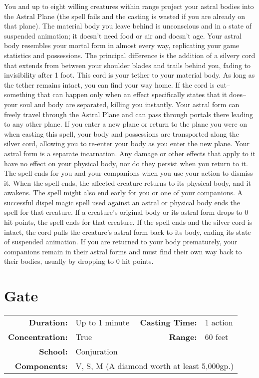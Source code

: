 \documentclass[a5paper, 12pt]{memoir}
\begin{document}
\vspace{1\baselineskip}\noindent You and up to eight willing creatures within range project your astral bodies into the Astral Plane (the spell fails and the casting is wasted if you are already on that plane). The material body you leave behind is unconscious and in a state of suspended animation; it doesn't need food or air and doesn't age. Your astral body resembles your mortal form in almost every way, replicating your game statistics and possessions. The principal difference is the addition of a silvery cord that extends from between your shoulder blades and trails behind you, fading to invisibility after 1 foot. This cord is your tether to your material body. As long as the tether remains intact, you can find your way home. If the cord is cut--something that can happen only when an effect specifically states that it does--your soul and body are separated, killing you instantly. Your astral form can freely travel through the Astral Plane and can pass through portals there leading to any other plane. If you enter a new plane or return to the plane you were on when casting this spell, your body and possessions are transported along the silver cord, allowing you to re-enter your body as you enter the new plane. Your astral form is a separate incarnation. Any damage or other effects that apply to it have no effect on your physical body, nor do they persist when you return to it. The spell ends for you and your companions when you use your action to dismiss it. When the spell ends, the affected creature returns to its physical body, and it awakens. The spell might also end early for you or one of your companions. A successful dispel magic spell used against an astral or physical body ends the spell for that creature. If a creature's original body or its astral form drops to 0 hit points, the spell ends for that creature. If the spell ends and the silver cord is intact, the cord pulls the creature's astral form back to its body, ending its state of suspended animation. If you are returned to your body prematurely, your companions remain in their astral forms and must find their own way back to their bodies, usually by dropping to 0 hit points.

\newpage
\section*{Gate}

{
\small\centering\vspace{-6pt}
\begin{tabular}{rlrl}
\toprule

\textbf{Duration:} & Up to 1 minute &
\textbf{Casting Time:} & 1 action \\
\textbf{Concentration:} & True &
\textbf{Range:} & 60 feet \\
\textbf{School:} & Conjuration \\
\textbf{Components:} & \multicolumn{3}{p{0.7\textwidth}}{V, S, M (A diamond worth at least 5,000gp.)}\\

\bottomrule
\end{tabular}
}
\end{document}
